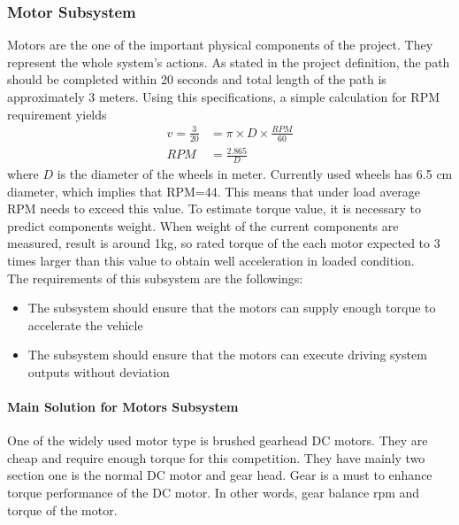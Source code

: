 \documentclass[a4paper,12pt]{article}
\begin{document}

	
	\subsubsection{Motor Subsystem}
	Motors are the one of the important physical components of the project. They represent the whole system's actions. As stated in the project definition, the path should be completed within 20 seconds and total length of the path is approximately 3 meters. Using this specifications, a simple calculation for RPM requirement yields
	\begin{equation}
	\begin{split}
	v=\frac{3}{20}&=\pi\times D\times\frac{RPM}{60}\\
	RPM&=\frac{2.865}{D}
	\end{split}
	\end{equation}
	where $D $ is the diameter of the wheels in meter. Currently used wheels has 6.5 cm diameter, which implies that RPM=44. This means that under load average RPM needs to exceed this value. To estimate torque value, it is necessary to predict components weight. When weight of the current components are measured, result is around 1kg, so rated torque of the each motor expected to 3 times larger than this value to obtain well acceleration in loaded condition. \\
	   
	The requirements of this subsystem are the followings:
	\begin{itemize}
		\item The subsystem should ensure that the motors can supply enough torque to accelerate the vehicle 
		\item The subsystem should ensure that the motors can execute driving system outputs without deviation
	\end{itemize}
	
	\paragraph{Main Solution for Motors Subsystem}
	One of the widely used motor type is brushed gearhead DC motors. They are cheap and require enough torque for this competition. They have mainly two section one is the normal DC motor and gear head. Gear is a must to enhance torque performance of the DC motor. In other words, gear balance rpm and torque of the motor. 
	 
\end{document}
